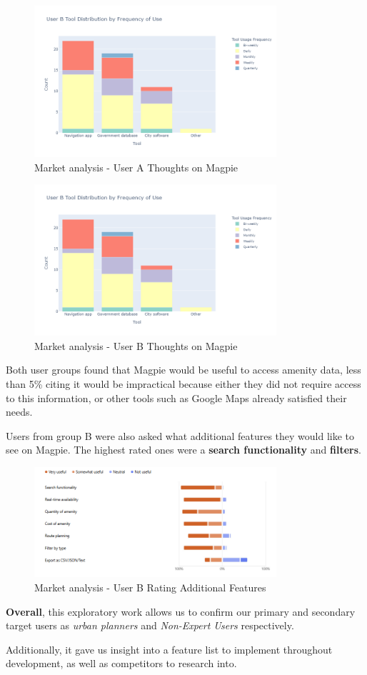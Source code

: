 \documentclass[preview]{standalone}
\begin{document}
\begin{figure}[htbp]
    \centering{}
    \includegraphics[width=0.8\textwidth]{images/mr-userb-tool-freq.png}
    \caption{Market analysis - User A Thoughts on Magpie}
\end{figure}

\begin{figure}[htbp]
    \centering{}
    \includegraphics[width=0.8\textwidth]{images/mr-userb-tool-freq.png}
    \caption{Market analysis - User B Thoughts on Magpie}
\end{figure}

Both user groups found that Magpie would be useful to access amenity data, less
than 5\% citing it would be impractical because either they did not require
access to this information, or other tools such as Google Maps already satisfied
their needs.

Users from group B were also asked what additional features they would like to
see on Magpie. The highest rated ones were a \textbf{search functionality} and
\textbf{filters}.

\begin{figure}[htbp]
    \centering{}
    \includegraphics[width=0.8\textwidth]{images/mr-extra-features.png}
    \caption{Market analysis - User B Rating Additional Features}
\end{figure}

\textbf{Overall}, this exploratory work allows us to confirm our primary and
secondary target users as \emph{urban planners} and \emph{Non-Expert Users}
respectively.

Additionally, it gave us insight into a feature list to implement throughout
development, as well as competitors to research into.
\end{document}

